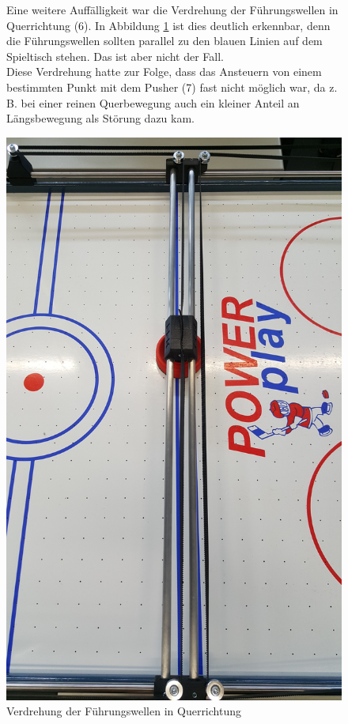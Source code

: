 \begin{figure} [h]

\begin{minipage}[t]{0.45\textwidth}
\vspace{0pt}
Eine weitere Auffälligkeit war die Verdrehung der Führungswellen in Querrichtung (6). In Abbildung \ref{HW_VQuer} ist dies deutlich erkennbar, denn die Führungswellen sollten parallel zu den blauen Linien auf dem Spieltisch stehen. Das ist aber nicht der Fall. \\
Diese Verdrehung hatte zur Folge, dass das Ansteuern von einem bestimmten Punkt mit dem Pusher (7) fast nicht möglich war, da z. B. bei einer reinen Querbewegung auch ein kleiner Anteil an Längsbewegung als Störung dazu kam.
\end{minipage}
\hspace{0.1\textwidth}
\begin{minipage}[t]{0.4\textwidth}
\vspace{0pt}
\includegraphics[width=\textwidth]{images/HW_VerdrehungQuerstrebe}
 \caption{Verdrehung der Führungswellen in Querrichtung}
\label{HW_VQuer}
\end{minipage}
\end{figure}



